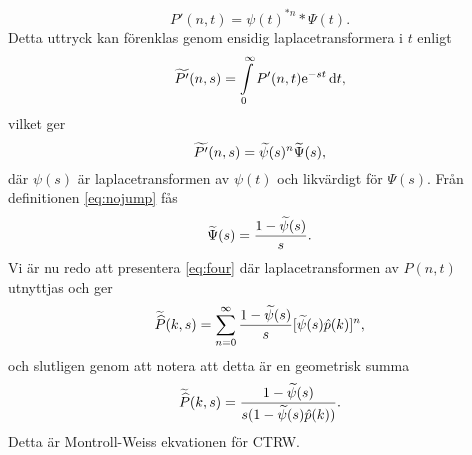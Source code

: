 \begin{equation}
P'(n,t) = \psi(t)^{*n}*\Psi(t).
\end{equation}
Detta uttryck kan förenklas genom ensidig laplacetransformera i $t$ enligt 
\begin{equation}
\PPs (n,s) = \int_0^\infty P'(n,t)\ee^{-st}\id{t},
\end{equation}
vilket ger 
\begin{equation}
\widetilde{P'} (n,s) = \widetilde{\psi}(s)^n\widetilde{\Psi}(s),
\end{equation}
där $\psi(s)$ är laplacetransformen av $\psi(t)$ och likvärdigt för $\Psi(s)$. Från definitionen \eqref{eq:nojump} fås 
\begin{equation}
\widetilde{\Psi}(s) = \frac{1-\widetilde{\psi} (s)}{s}.
\end{equation}
Vi är nu redo att presentera \eqref{eq:four} där laplacetransformen av $P(n,t)$ utnyttjas och ger 
\begin{equation}
\widetilde{\widehat{P}} (k,s) = \sum_{n=0}^{\infty} \frac{1-\widetilde{\psi} (s)}{s}[\widetilde{\psi} (s)\hat{p} (k)]^n,
\end{equation}
och slutligen genom att notera att detta är en geometrisk summa 
\begin{equation}\label{eq:master}
\widetilde{\widehat{P}} (k,s) = \frac{1-\widetilde{\psi} (s)}{s(1-\widetilde{\psi} (s)\hat{p} (k))}.
\end{equation}
Detta är Montroll-Weiss ekvationen för CTRW.

